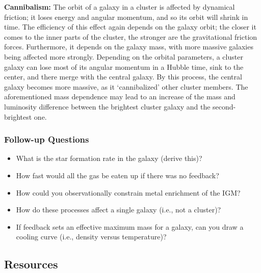 \documentclass[a4paper,11pt]{article}
\begin{document}
{\noindent}\textbf{Cannibalism:} The orbit of a galaxy in a cluster is affected by dynamical friction; it loses energy and angular momentum, and so its orbit will shrink in time. The efficiency of this effect again depends on the galaxy orbit; the closer it comes to the inner parts of the cluster, the stronger are the gravitational friction forces. Furthermore, it depends on the galaxy mass, with more massive galaxies being affected more strongly. Depending on the orbital parameters, a cluster galaxy can lose most of its angular momentum in a Hubble time, sink to the center, and there merge with the central galaxy. By this process, the central galaxy becomes more massive, as it `cannibalized' other cluster members. The aforementioned mass dependence may lead to an increase of the mass and luminosity difference between the brightest cluster galaxy and the second-brightest one.


\subsubsection{Follow-up Questions}

\begin{itemize}
    \item What is the star formation rate in the galaxy (derive this)? 
    \item How fast would all the gas be eaten up if there was no feedback?
    \item How could you observationally constrain metal enrichment of the IGM?
    \item How do these processes affect a single galaxy (i.e., not a cluster)?
    \item If feedback sets an effective maximum mass for a galaxy, can you draw a cooling curve (i.e., density versus temperature)? 
\end{itemize}


\newpage
\subsection{Resources}
\end{document}
